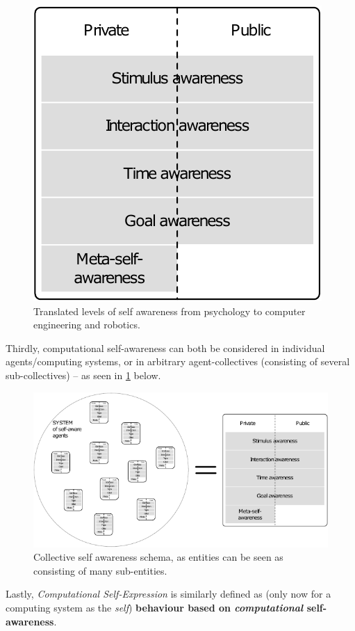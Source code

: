 	\begin{figure}[!htp]
	\centering
	\includegraphics[width=0.5\columnwidth]{Assets/DocSegments/Chapters/Background/Figures/Schema/SA_levels.pdf}
	\caption{Translated levels of self awareness from psychology to computer engineering and robotics.}
	\end{figure}

	Thirdly, computational self-awareness can both be considered in individual agents/computing systems, or in arbitrary agent-collectives (consisting of several sub-collectives) -- as seen in \ref{fig:collective_SA} below.

	\begin{figure}[!htp]
	\centering
	\includegraphics[width=\columnwidth]{Assets/DocSegments/Chapters/Background/Figures/Schema/collective_SA.pdf}
	\caption[Collective self awareness schema.]{Collective self awareness schema, as entities can be seen as consisting of many sub-entities.}
	\label{fig:collective_SA}
	\end{figure}

	Lastly, \textit{Computational Self-Expression} is similarly defined as  (only now for a computing system as the \textit{self}) \textbf{behaviour based on \textit{computational} self-awareness}.
	\newline

